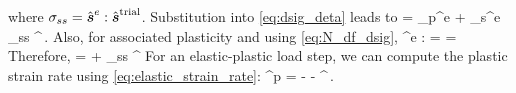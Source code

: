 \Eeq
where $\sigma_{ss} = \hat{\boldsymbol{s}}^e:\hat{\boldsymbol{s}}^{\text{trial}}$.
Substitution into \eqref{eq:dsig_deta} leads to
\Beq
  \Partial{\Bsig}{\eta} =          
      \Partial{\kappa}{\eta} \sigma_p^e \hat{\BI} + 
      \Partial{\mu}{\eta} \sigma_s^e \sigma_{ss} \hat{\BsT}^\Trial \,.
\Eeq
Also, for associated plasticity and using \eqref{eq:N_df_dsig}, 
\Beq \label{eq:CM_iso}
  \SfC^e : \hat{\BM} =  = 
\Eeq
Therefore,
\Beq \label{eq:P_iso}
  \BP =  \hat{\BI} + 
         \sigma_{ss} \hat{\BsT}^\Trial
\Eeq
For an elastic-plastic load step, we can compute the plastic strain rate  
using \eqref{eq:elastic_strain_rate}:
\Beq \label{eq:plastic_strain_rate}
  \dot{\BVeps}^p = \dot{\BVeps} - 
     \hat{\BI} - 
     \hat{\BsT}^\Trial \,.
\Eeq


